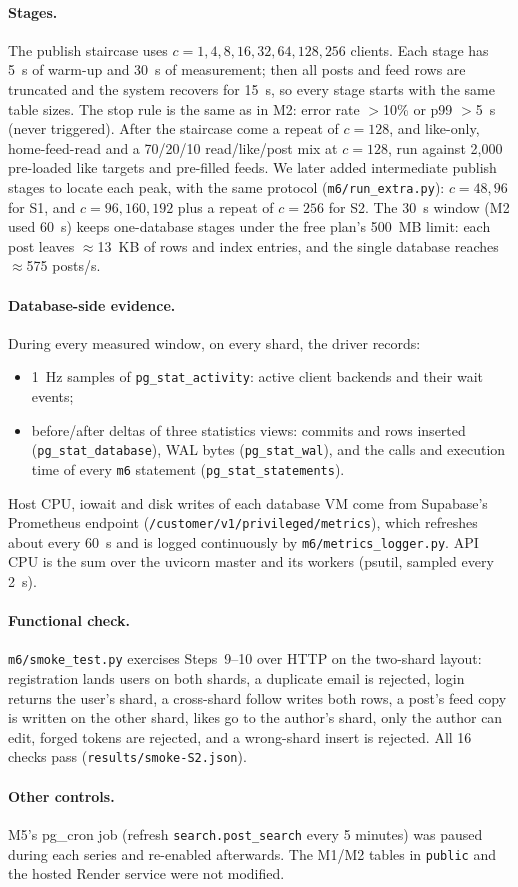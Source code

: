 \paragraph{Stages.} The publish staircase uses $c=1,4,8,16,32,64,128,256$ clients. Each stage has 5~s of warm-up and
30~s of measurement; then all posts and feed rows are truncated and the system recovers for 15~s, so every stage
starts with the same table sizes. The stop rule is the same as in M2: error rate $>$10\% or p99 $>$5~s (never
triggered). After the staircase come a repeat of $c=128$, and like-only, home-feed-read and a 70/20/10 read/like/post
mix at $c=128$, run against 2{,}000 pre-loaded like targets and pre-filled feeds. We later added intermediate publish
stages to locate each peak, with the same protocol (\texttt{m6/run\_extra.py}): $c=48,96$ for S1, and $c=96,160,192$
plus a repeat of $c=256$ for S2.
The 30~s window (M2 used 60~s) keeps one-database stages under the free plan's 500~MB limit: each post leaves
$\approx$13~KB of rows and index entries, and the single database reaches $\approx$575 posts/s.

\paragraph{Database-side evidence.} During every measured window, on every shard, the driver records:
\begin{itemize}[nosep,leftmargin=1.2em]
\item 1~Hz samples of \texttt{pg\_stat\_activity}: active client backends and their wait events;
\item before/after deltas of three statistics views: commits and rows inserted (\texttt{pg\_stat\_database}),
      WAL bytes (\texttt{pg\_stat\_wal}), and the calls and execution time of every \texttt{m6} statement
      (\texttt{pg\_stat\_statements}).
\end{itemize}
Host CPU, iowait and disk writes of each database VM come from Supabase's Prometheus endpoint
(\texttt{/customer/v1/\allowbreak privileged/\allowbreak metrics}), which refreshes about every 60~s and is logged continuously by
\texttt{m6/metrics\_logger.py}. API CPU is the sum over the uvicorn master and its workers (psutil, sampled every 2~s).

\paragraph{Functional check.} \texttt{m6/smoke\_test.py} exercises Steps~9--10 over HTTP on the two-shard layout:
registration lands users on both shards, a duplicate email is rejected, login returns the user's shard, a cross-shard follow writes
both rows, a post's feed copy is written on the other shard, likes go to the author's shard, only the author can edit,
forged tokens are rejected, and a wrong-shard insert is rejected. All 16 checks pass (\texttt{results/smoke-S2.json}).

\paragraph{Other controls.} M5's pg\_cron job (refresh \texttt{search.post\_search} every 5 minutes) was paused
during each series and re-enabled afterwards. The M1/M2 tables in \texttt{public} and the hosted Render service were
not modified.
